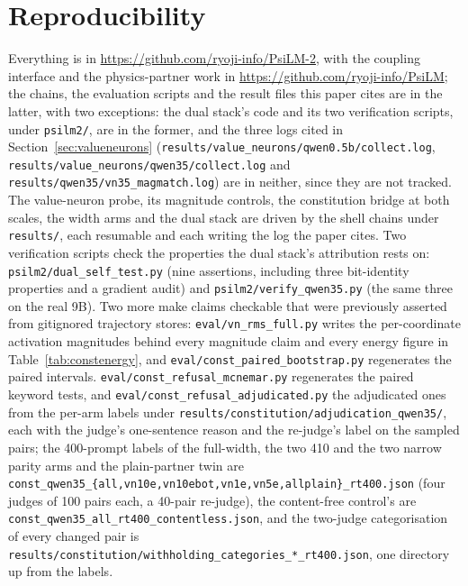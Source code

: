 \documentclass[11pt]{article}
\newcommand{\code}[1]{\texttt{#1}}
\begin{document}
\section{Reproducibility}
\label{sec:repro2}

Everything is in \url{https://github.com/ryoji-info/PsiLM-2}, with the coupling
interface and the physics-partner work in \url{https://github.com/ryoji-info/PsiLM};
the chains, the evaluation scripts and the result files this paper cites are in
the latter, with two exceptions: the dual stack's code and its two verification
scripts, under \code{psilm2/}, are in the former, and the three logs cited in
Section~\ref{sec:valueneurons}
(\code{results/\allowbreak{}value\_\allowbreak{}neurons/\allowbreak{}qwen0.5b/\allowbreak{}collect.log},
\code{results/\allowbreak{}value\_\allowbreak{}neurons/\allowbreak{}qwen35/\allowbreak{}collect.log} and
\code{results/\allowbreak{}qwen35/\allowbreak{}vn35\_\allowbreak{}magmatch.log}) are in neither,
since they are not tracked.
The value-neuron probe, its magnitude controls, the constitution bridge at both
scales, the width arms and the dual stack are driven by the shell chains under
\code{results/}, each resumable and each writing the log the paper cites.
Two verification scripts check the properties the dual stack's attribution rests
on: \code{psilm2/dual\_self\_test.py} (nine assertions, including three
bit-identity properties and a gradient audit) and \code{psilm2/verify\_qwen35.py}
(the same three on the real 9B). Two more make claims checkable that were
previously asserted from gitignored trajectory stores:
\code{eval/vn\_rms\_full.py} writes the per-coordinate activation magnitudes behind
every magnitude claim and every energy figure in Table~\ref{tab:constenergy}, and
\code{eval/const\_paired\_bootstrap.py} regenerates the paired intervals.
\code{eval/const\_refusal\_mcnemar.py} regenerates the paired keyword tests, and
\code{eval/const\_refusal\_adjudicated.py} the adjudicated ones from the per-arm labels
under \code{results/constitution/adjudication\_qwen35/}, each with the judge's
one-sentence reason and the re-judge's label on the sampled pairs; the 400-prompt labels of the
full-width, the two 410 and the two narrow parity arms and the plain-partner twin are
\code{const\_\allowbreak{}qwen35\_\allowbreak{}\{all,\allowbreak{}vn10e,\allowbreak{}vn10ebot,\allowbreak{}vn1e,\allowbreak{}vn5e,\allowbreak{}allplain\}\_\allowbreak{}rt400.json}
(four judges of 100 pairs each, a 40-pair re-judge), the content-free control's
are \code{const\_\allowbreak{}qwen35\_\allowbreak{}all\_\allowbreak{}rt400\_\allowbreak{}contentless.json},
and the two-judge categorisation of every changed pair is
\code{results/\allowbreak{}constitution/\allowbreak{}withholding\_\allowbreak{}categories\_\allowbreak{}*\_rt400.json}, one directory up from the labels.
\end{document}
